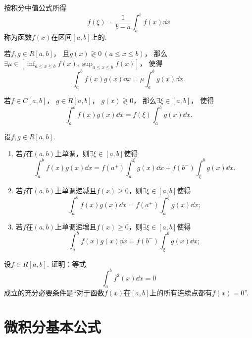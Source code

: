 按积分中值公式所得\[
	f(\xi) = \frac{1}{b-a} \int_a^b f(x) \dd{x}
\]
称为函数\(f(x)\)在区间\([a,b]\)上的.

\begin{theorem}[积分第一中值定理]\label{theorem:定积分.积分中值定理1}
若\(f,g \in R[a,b]\)，
且\(g(x) \gtrless 0\ (a \leq x \leq b)\)，
那么\(\exists\mu\in\left[
	\inf_{a \leq x \leq b} f(x),
	\sup_{a \leq x \leq b} f(x)
\right]\)，
使得\[
	\int_a^b f(x) g(x) \dd{x} = \mu \int_a^b g(x) \dd{x}.
\]
\end{theorem}

\begin{corollary}\label{theorem:定积分.积分中值定理1推论1}
若\(f \in C[a,b]\)，
\(g \in R[a,b]\)，
\(g(x) \gtrless 0\)，
那么\(\exists\xi\in[a,b]\)，
使得\[
	\int_a^b f(x) g(x) \dd{x}
	= f(\xi) \int_a^b g(x) \dd{x}.
\]
\end{corollary}

\begin{theorem}[积分第二中值定理]\label{theorem:定积分.积分中值定理2}
设\(f,g \in R[a,b]\).\begin{enumerate}
\item 若\(f\)在\((a,b)\)上单调，则\(\exists \xi \in [a,b]\)使得\[
\int_a^b f(x) g(x) \dd{x} = f(a^+) \int_a^{\xi} g(x) \dd{x} + f(b^-) \int_{\xi}^b g(x) \dd{x}.
\]
\item 若\(f\)在\((a,b)\)上单调递减且\(f(x) \geq 0\)，则\(\exists \xi \in [a,b]\)使得\[
\int_a^b f(x) g(x) \dd{x} = f(a^+) \int_a^{\xi} g(x) \dd{x};
\]
\item 若\(f\)在\((a,b)\)上单调递增且\(f(x) \geq 0\)，则\(\exists \xi \in [a,b]\)使得\[
\int_a^b f(x) g(x) \dd{x} = f(b^-) \int_{\xi}^b g(x) \dd{x};
\]
\end{enumerate}
\end{theorem}

\begin{example}
设\(f \in R[a,b]\).
证明：等式\[
\int_a^b f^2(x) \dd{x} = 0
\]成立的充分必要条件是“对于函数\(f(x)\)在\([a,b]\)上的所有连续点都有\(f(x)=0\)”.
\end{example}

\section{微积分基本公式}
